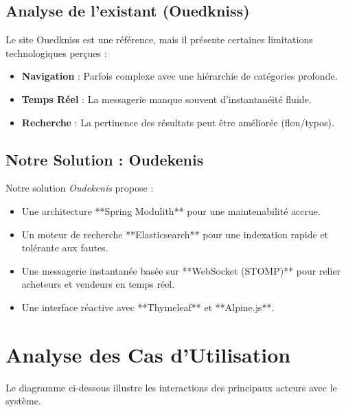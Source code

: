 \documentclass[12pt,a4paper]{article}
\begin{document}
\subsection{Analyse de l'existant (Ouedkniss)}
Le site Ouedkniss est une référence, mais il présente certaines limitations technologiques perçues :
\begin{itemize}
    \item \textbf{Navigation} : Parfois complexe avec une hiérarchie de catégories profonde.
    \item \textbf{Temps Réel} : La messagerie manque souvent d'instantanéité fluide.
    \item \textbf{Recherche} : La pertinence des résultats peut être améliorée (flou/typos).
\end{itemize}

\subsection{Notre Solution : Oudekenis}
Notre solution \textit{Oudekenis} propose :
\begin{itemize}
    \item Une architecture **Spring Modulith** pour une maintenabilité accrue.
    \item Un moteur de recherche **Elasticsearch** pour une indexation rapide et tolérante aux fautes.
    \item Une messagerie instantanée basée sur **WebSocket (STOMP)** pour relier acheteurs et vendeurs en temps réel.
    \item Une interface réactive avec **Thymeleaf** et **Alpine.js**.
\end{itemize}

\newpage

\section{Analyse des Cas d'Utilisation}

Le diagramme ci-dessous illustre les interactions des principaux acteurs avec le système.
\end{document}
